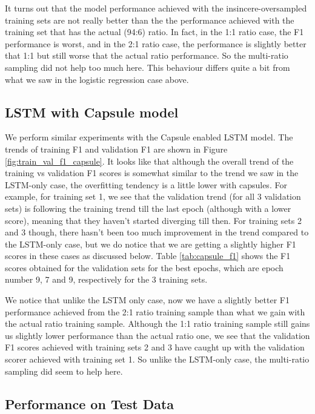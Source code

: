 \documentclass[11pt,twocolumn,letterpaper]{article}
\begin{document}
It turns out that the model performance achieved with the insincere-oversampled training sets are not really better than the the performance achieved with the training set that has the actual (94:6) ratio. In fact, in the 1:1 ratio case, the F1 performance is worst, and in the 2:1 ratio case, the performance is slightly better that 1:1 but still worse that the actual ratio performance. So the multi-ratio sampling did not help too much here. This behaviour differs quite a bit from what we saw in the logistic regression case above. 

\subsection{LSTM with Capsule model}

We perform similar experiments with the Capsule enabled LSTM model. The trends of training F1 and validation F1 are shown in Figure \ref{fig:train_val_f1_capsule}. It looks like that although the overall trend of the training vs validation F1 scores is somewhat similar to the trend we saw in the LSTM-only case, the overfitting tendency is a little lower with capsules. For example, for training set 1, we see that the validation trend (for all 3 validation sets) is following the training trend till the last epoch (although with a lower score), meaning that they haven't started diverging till then. For training sets 2 and 3 though, there hasn't been too much improvement in the trend compared to the LSTM-only case, but we do notice that we are getting a slightly higher F1 scores in these cases as discussed below. Table \ref{tab:capsule_f1} shows the F1 scores obtained for the validation sets for the best epochs, which are epoch number 9, 7 and 9, respectively for the 3 training sets. 

We notice that unlike the LSTM only case, now we have a slightly better F1 performance achieved from the 2:1 ratio training sample than what we gain with the actual ratio training sample. Although the 1:1 ratio training sample still gains us slightly lower performance than the actual ratio one, we see that the validation F1 scores achieved with training sets 2 and 3 have caught up with the validation scorer achieved with training set 1. So unlike the LSTM-only case, the multi-ratio sampling did seem to help here.

\subsection{Performance on Test Data}
\end{document}
